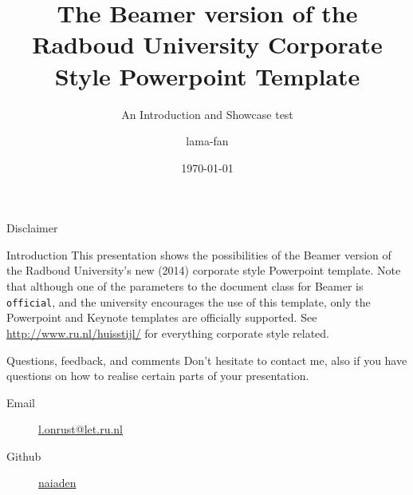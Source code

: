 \documentclass[department=none, notes={show notes}, slidesperpage=4, official=true, handout]{beamerruhuisstijl}
\title{The Beamer version of the Radboud University Corporate Style Powerpoint Template}
\subtitle{An Introduction and Showcase test}
\date{\today}
\author{lama-fan}
\begin{document}
\begin{frame}
    \titlepage
\end{frame}

\begin{frame}{Disclaimer}
	\begin{block}{Introduction}
    	This presentation shows the possibilities of the Beamer version of the Radboud University's new (2014) corporate style Powerpoint template. Note that although one of the parameters to the document class for Beamer is \texttt{official}, and the university encourages the use of this template, only the Powerpoint and Keynote templates are officially supported. See \url{http://www.ru.nl/huisstijl/} for everything corporate style related.
    \end{block}
    
    \begin{block}{Questions, feedback, and comments}
    	Don't hesitate to contact me, also if you have questions on how to realise certain parts of your presentation.
    	\begin{description}
        	\item[Email] \href{mailto:l.onrust@let.ru.nl}{l.onrust@let.ru.nl}
            \item[Github] \href{https://github.com/naiaden}{naiaden}
        \end{description}
    \end{block}
\end{frame}   
\end{document}
